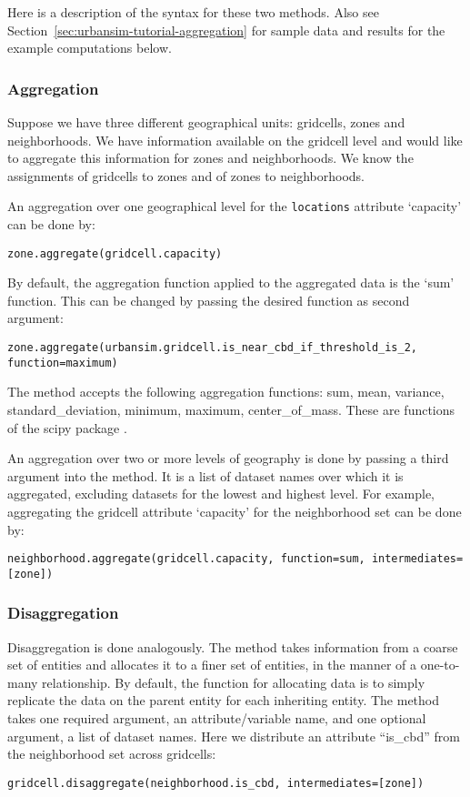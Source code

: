 Here is a description of the syntax for these two methods.  Also see 
Section~\ref{sec:urbansim-tutorial-aggregation} for sample data and results
for the example computations below.

\subsubsection{Aggregation}

Suppose we have three different geographical units: gridcells, zones and
neighborhoods.  We have information available on the gridcell level and
would like to aggregate this information for zones and neighborhoods. We
know the assignments of gridcells to zones and of zones to neighborhoods.

An aggregation over one geographical level for the \verb|locations|
attribute `capacity' can be done by: 
\begin{verbatim}
zone.aggregate(gridcell.capacity)
\end{verbatim}
By default, the aggregation function applied to the aggregated data is the
`sum' function. This can be changed by passing the desired function as second
argument:
\begin{verbatim}
zone.aggregate(urbansim.gridcell.is_near_cbd_if_threshold_is_2, function=maximum)
\end{verbatim}

The  method accepts the following aggregation functions:
sum, mean, variance, standard_deviation, minimum, maximum,
center_of_mass. These are functions of the scipy package
.

An aggregation over two or more levels of geography is done by passing a
third argument into the  method. It is a list of dataset
  names over which it is aggregated, excluding datasets
  for the lowest and highest level. For example, aggregating
the gridcell attribute `capacity' for the neighborhood set
can be done by: 
\begin{verbatim}
neighborhood.aggregate(gridcell.capacity, function=sum, intermediates=[zone])
\end{verbatim}

\subsubsection{Disaggregation}

Disaggregation is done analogously. The  method takes
information from a coarse set of entities and allocates it to a finer set of
entities, in the manner of a one-to-many relationship. By default, the function
for allocating data is to simply replicate the data on the parent entity for
each inheriting entity. The method takes one required argument, an
attribute/variable
name, and one optional argument, a list of
dataset names. Here we distribute an attribute
``is_cbd'' from the neighborhood set across gridcells:
\begin{verbatim}
gridcell.disaggregate(neighborhood.is_cbd, intermediates=[zone])
\end{verbatim}

